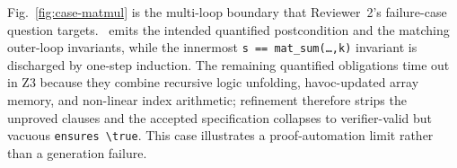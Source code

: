 Fig.~\ref{fig:case-matmul} is the multi-loop boundary that Reviewer~2's failure-case question targets. \toolname\ emits the intended quantified postcondition and the matching outer-loop invariants, while the innermost \texttt{s == mat\_sum(\dots,k)} invariant is discharged by one-step induction. The remaining quantified obligations time out in Z3 because they combine recursive logic unfolding, havoc-updated array memory, and non-linear index arithmetic; refinement therefore strips the unproved clauses and the accepted specification collapses to verifier-valid but vacuous \texttt{ensures \textbackslash true}. This case illustrates a proof-automation limit rather than a generation failure.
